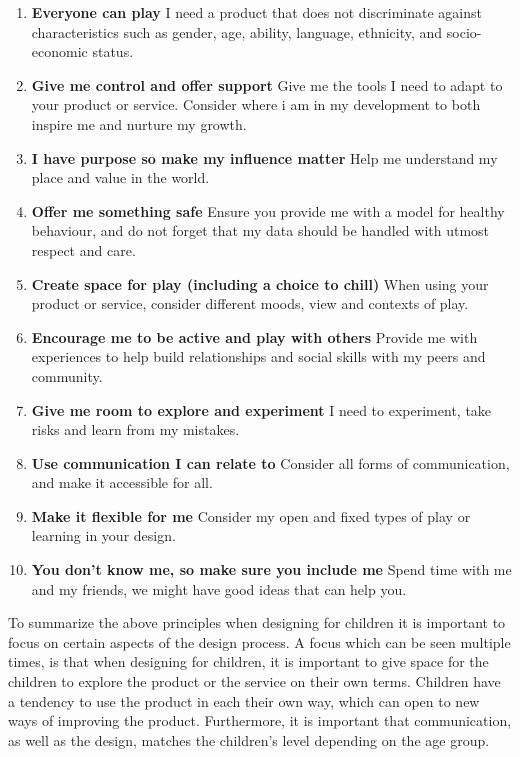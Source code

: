 \begin{enumerate}\label{princelist}
    \item \textbf{Everyone can play} I need a product that does not discriminate against characteristics such as gender, age, ability, language, ethnicity, and socio-economic status.
    \item \textbf{Give me control and offer support} Give me the tools I need to adapt to your product or service. Consider where i am in my development to both inspire me and nurture my growth.
    \item \textbf{I have purpose so make my influence matter} Help me understand my place and value in the world.
    \item \textbf{Offer me something safe} Ensure you provide me with a model for healthy behaviour, and do not forget that my data should be handled with utmost respect and care.
    \item \textbf{Create space for play (including a choice to chill)} When using your product or service, consider different moods, view and contexts of play.
    \item \textbf{Encourage me to be active and play with others} Provide me with experiences to help build relationships and social skills with my peers and community. 
    \item \textbf{Give me room to explore and experiment} I need to experiment, take risks and learn from my mistakes.
    \item \textbf{Use communication I can relate to} Consider all forms of communication, and make it accessible for all.
    \item \textbf{Make it flexible for me} Consider my open and fixed types of play or learning in your design.
    \item \textbf{You don’t know me, so make sure you include me} Spend time with me and my friends, we might have good ideas that can help you.
\end{enumerate}

To summarize the above principles when designing for children it is important to focus on certain aspects of the design process. A focus which can be seen multiple times, is that when designing for children, it is important to give space for the children to explore the product or the service on their own terms. Children have a tendency to use the product in each their own way, which can open to new ways of improving the product. Furthermore, it is important that communication, as well as the design, matches the children's level depending on the age group. 

